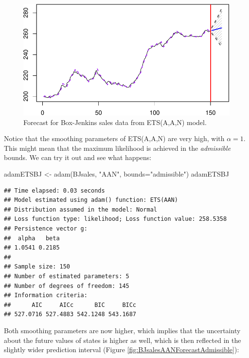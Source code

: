 \documentclass[
]{book}
\newenvironment{Shaded}{\begin{snugshade}}{\end{snugshade}}
\newcommand{\AttributeTok}[1]{\textcolor[rgb]{0.77,0.63,0.00}{#1}}
\newcommand{\FunctionTok}[1]{\textcolor[rgb]{0.00,0.00,0.00}{#1}}
\newcommand{\NormalTok}[1]{#1}
\newcommand{\OtherTok}[1]{\textcolor[rgb]{0.56,0.35,0.01}{#1}}
\newcommand{\StringTok}[1]{\textcolor[rgb]{0.31,0.60,0.02}{#1}}
\theoremstyle{definition}
\theoremstyle{definition}
\theoremstyle{definition}
\theoremstyle{definition}
\theoremstyle{remark}
\begin{document}
\begin{figure}
\centering
\includegraphics{Svetunkov--2022----ADAM_files/figure-latex/BJsalesAANForecast-1.pdf}
\caption{\label{fig:BJsalesAANForecast}Forecast for Box-Jenkins sales data from ETS(A,A,N) model.}
\end{figure}

Notice that the smoothing parameters of ETS(A,A,N) are very high, with \(\alpha=1\). This might mean that the maximum likelihood is achieved in the \emph{admissible} bounds. We can try it out and see what happens:

\begin{Shaded}
\begin{Highlighting}[]
\NormalTok{adamETSBJ }\OtherTok{\textless{}{-}} \FunctionTok{adam}\NormalTok{(BJsales, }\StringTok{"AAN"}\NormalTok{, }\AttributeTok{bounds=}\StringTok{"admissible"}\NormalTok{)}
\NormalTok{adamETSBJ}
\end{Highlighting}
\end{Shaded}

\begin{verbatim}
## Time elapsed: 0.03 seconds
## Model estimated using adam() function: ETS(AAN)
## Distribution assumed in the model: Normal
## Loss function type: likelihood; Loss function value: 258.5358
## Persistence vector g:
##  alpha   beta 
## 1.0541 0.2185 
## 
## Sample size: 150
## Number of estimated parameters: 5
## Number of degrees of freedom: 145
## Information criteria:
##      AIC     AICc      BIC     BICc 
## 527.0716 527.4883 542.1248 543.1687
\end{verbatim}

Both smoothing parameters are now higher, which implies that the uncertainty about the future values of states is higher as well, which is then reflected in the slightly wider prediction interval (Figure \ref{fig:BJsalesAANForecastAdmissible}):
\end{document}
